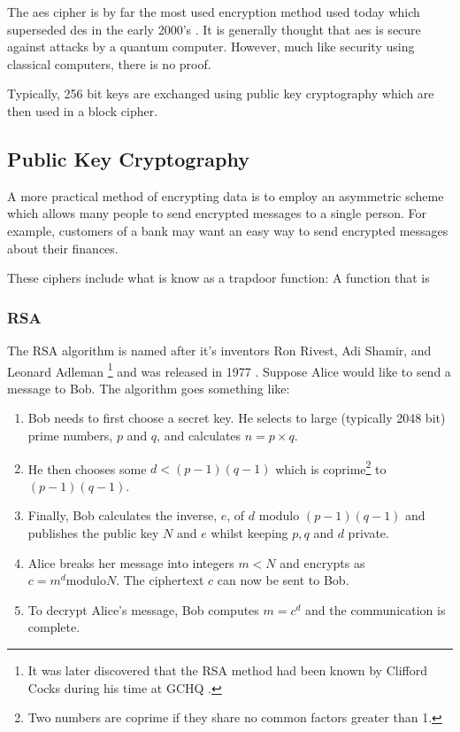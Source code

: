 The \ac{aes} cipher is by far the most used encryption method used today which superseded \ac{des} in the early 2000's \cite{}. It is generally thought that \ac{aes} is secure against attacks by a quantum computer. However, much like security using classical computers, there is no proof.

Typically, 256 bit keys are exchanged using public key cryptography which are then used in a block cipher. 



\subsection{Public Key Cryptography}

A more practical method of encrypting data is to employ an asymmetric scheme which allows many people to send encrypted messages to a single person. For example, customers of a bank may want an easy way to send encrypted messages about their finances.

These ciphers include what is know as a {\color{bristol-red} trapdoor function}: A function that is 

\subsubsection*{RSA}

The RSA algorithm is named after it's inventors Ron Rivest, Adi Shamir, and Leonard Adleman 
\footnote{It was later discovered that the RSA method had been known by Clifford Cocks during his time at GCHQ \cite{}.} and was released in 1977 \cite{}. Suppose Alice would like to send a message to Bob. The algorithm goes something like:

\begin{enumerate}
	\item Bob needs to first choose a secret key. He selects to large (typically 2048 bit) prime numbers, $p$ and $q$, and calculates $n = p \times q$.
	\item He then chooses some $d < (p-1)(q-1)$ which is coprime\footnote{Two numbers are coprime if they share no common factors greater than 1.} to $(p-1)(q-1)$.
	\item Finally, Bob calculates the inverse, $e$, of $d$ modulo $(p-1)(q-1)$ and publishes the public key $N$ and $e$ whilst keeping $p,q$ and $d$ private.
	\item Alice breaks her message into integers $m < N$ and encrypts as $c = m^d \mathrm{modulo} N$. The ciphertext $c$ can now be sent to Bob.
	\item To decrypt Alice's message, Bob computes $m = c^d$ and the communication is complete. 
\end{enumerate}   

